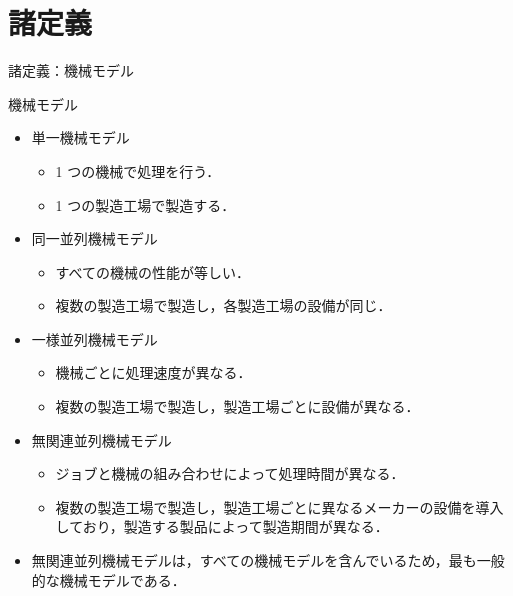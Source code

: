 \documentclass[dvipdfmx]{beamer}
\begin{document}
    \section{諸定義}
    \begin{frame}{諸定義：機械モデル}
      \begin{block}{機械モデル}
        \begin{itemize}
          \item \alert{単一機械モデル}
          \begin{itemize}
            \item 1 つの機械で処理を行う．
            \item 1 つの製造工場で製造する．
          \end{itemize}
          \item \alert{同一並列機械モデル}
          \begin{itemize}
            \item すべての機械の性能が等しい．
            \item 複数の製造工場で製造し，各製造工場の設備が同じ．
          \end{itemize}
          \item \alert{一様並列機械モデル}
          \begin{itemize}
            \item 機械ごとに処理速度が異なる．
            \item 複数の製造工場で製造し，製造工場ごとに設備が異なる．
          \end{itemize}
          \item \alert{無関連並列機械モデル}
          \begin{itemize}
            \item ジョブと機械の組み合わせによって処理時間が異なる．
            \item 複数の製造工場で製造し，製造工場ごとに異なるメーカーの設備を導入しており，製造する製品によって製造期間が異なる．
          \end{itemize}
        \end{itemize}
      \end{block}
      \begin{itemize}
        \item 無関連並列機械モデルは，すべての機械モデルを含んでいるため，最も一般的な機械モデルである．
      \end{itemize}
    \end{frame}
\end{document}
